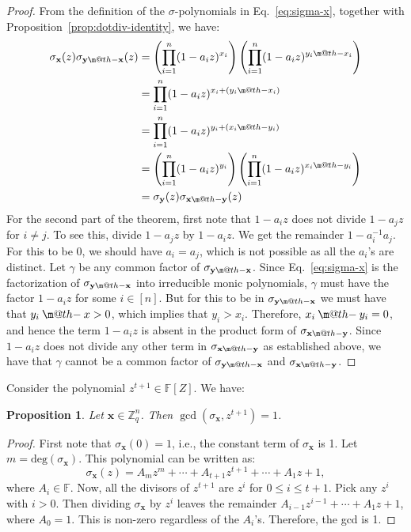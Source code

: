 \documentclass[pdflatex,sn-mathphys-num]{sn-jnl}
\makeatletter
\newcommand{\dotdiv}{\mathbin{\text{\@dotdiv}}}
\newcommand{\@dotdiv}{%
  \ooalign{\hidewidth\raise1ex\hbox{.}\hidewidth\cr$\m@th-$\cr}%
}
\newtheorem{proposition}{Proposition}
\theoremstyle{definition}
\newcommand{\vtr}[1]{\mathbf{#1}}
\makeatother
\begin{document}
\begin{proof}
From the definition of the $\sigma$-polynomials in Eq.~\eqref{eq:sigma-x}, together with Proposition~\ref{prop:dotdiv-identity}, we have:
\begin{align*}
     \sigma_\vtr{x}(z) \sigma_{\vtr{y} \dotdiv \vtr{x}} (z) &= \left( \prod_{i=1}^n (1 - a_iz)^{x_i} \right) \left( \prod_{i=1}^n (1 - a_iz)^{y_i \dotdiv x_i} \right) \\
     &= \prod_{i=1}^n (1 - a_iz)^{x_i + (y_i \dotdiv x_i)} \\
     &= \prod_{i=1}^n (1 - a_iz)^{y_i + (x_i \dotdiv y_i)} \\
     &= \left( \prod_{i=1}^n (1 - a_iz)^{y_i} \right) \left( \prod_{i=1}^n (1 - a_iz)^{x_i \dotdiv y_i} \right)\\
     &= \sigma_\vtr{y}(z) \sigma_{\vtr{x} \dotdiv \vtr{y}}(z)
\end{align*}
For the second part of the theorem, first note that $1 - a_i z $ does not divide $1 - a_j z$ for $i \neq j$. To see this, divide  $1 - a_j z$ by $1 - a_i z$. We get the remainder $1 - a_i^{-1} a_j$. For this to be 0, we should have $a_i = a_j$, which is not possible as all the $a_i$'s are distinct. Let $\gamma$ be any common factor of $\sigma_{\vtr{y} \dotdiv \vtr{x}} $. Since Eq.~\eqref{eq:sigma-x} is the factorization of $\sigma_{\vtr{y} \dotdiv \vtr{x}}$ into irreducible monic polynomials, $\gamma$ must have the factor $1 - a_iz$ for some $i \in [n]$. But for this to be in $\sigma_{\vtr{y} \dotdiv \vtr{x}}$ we must have that $y_i \dotdiv x > 0$, which implies that $y_i > x_i$. Therefore, $x_i \dotdiv y_i = 0$, and hence the term $1 - a_i z$ is absent in the product form of $\sigma_{\vtr{x} \dotdiv \vtr{y}}$. Since $1 - a_i z$ does not divide any other term in 
$\sigma_{\vtr{x} \dotdiv \vtr{y}}$ as established above, we have that $\gamma$ cannot be a common factor of $\sigma_{\vtr{y} \dotdiv \vtr{x}}$ and $ \sigma_{\vtr{x} \dotdiv \vtr{y}}$. 
\end{proof}

Consider the polynomial $z^{t+1} \in \mathbb{F}[Z]$. We have:
\begin{proposition}
\label{prop:gcd}
Let $\vtr{x} \in \mathbb{Z}_q^n$. Then $\gcd (\sigma_\vtr{x}, z^{t+1}) = 1$.
\end{proposition}
\begin{proof}
First note that $\sigma_\vtr{x}(0) = 1$, i.e., the constant term of $\sigma_\vtr{x}$ is 1. Let $m = \text{deg} (\sigma_\vtr{x})$. This polynomial can be written as:
\[
 \sigma_\vtr{x}(z) = A_{m}z^m + \cdots + A_{t+1}z^{t+1} + \cdots + A_1z + 1,
\]
where $A_i \in \mathbb{F}$. Now, all the divisors of $z^{t+1}$ are $z^i$ for $0 \leq i \leq t+1$. Pick any $z^i$ with $i > 0$. Then dividing $\sigma_\vtr{x}$ by $z^i$ leaves the remainder $A_{i-1}z^{i-1} + \cdots + A_1 z +  1$, where $A_0 = 1$. This is non-zero regardless of the $A_i$'s. Therefore, the gcd is 1. 
\end{proof}
\end{document}
